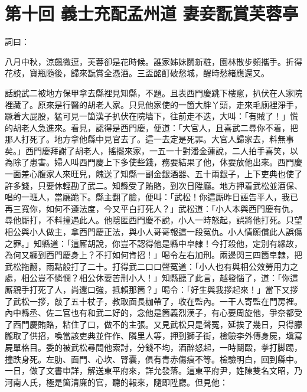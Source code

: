 
\chapter*{第十回 義士充配孟州道 妻妾翫賞芙蓉亭}


詞曰：

\begin{myquote}
八月中秋，涼飆微逗，芙蓉卻是花時候。誰家姊妹鬬新粧，園林散步頻攜手。折得花枝，寶瓶隨後，歸來翫賞全憑酒。三盃酩酊破愁城，醒時愁緒應還又。

\end{myquote}

話說武二被地方保甲拿去縣裡見知縣，不題。且表西門慶跳下樓窻，扒伏在人家院裡藏了。原來是行醫的胡老人家。只見他家使的一箇大胖丫頭，走來毛廁裡淨手，蹶着大屁股，猛可見一箇漢子扒伏在院墻下，往前走不迭，大叫：「有賊了！」{}慌的胡老人急進來。看見，認得是西門慶，便道：「大官人，且喜武二尋你不着，把那人打死了。地方拿他縣中見官去了。這一去定是死罪。大官人歸家去，料無事矣。」西門慶拜謝了胡老人，搖擺來家，一五一十對潘金蓮說，二人拍手喜笑，以為除了患害。{}婦人叫西門慶上下多使些錢，務要結果了他，休要放他出來。西門慶一面差心腹家人來旺兒，餽送了知縣一副金銀酒器、五十兩銀子，上下吏典也使了許多錢，只要休輕勘了武二。知縣受了賄賂，到次日陞廳。地方押着武松並酒保、唱的一班人，當廳跪下。縣主翻了臉，便叫：「武松！你這厮昨日誣告平人，我已再三寬你，如何不遵法度，今又平白打死人？」武松道：「小人本與西門慶有仇，尋他厮打，不料撞遇此人。他隱匿西門慶不說，小人一時怒起，誤將他打死。只望相公與小人做主，拿西門慶正法，與小人哥哥報這一段冤仇。小人情願償此人誤傷之罪。」知縣道：「這厮胡說，你豈不認得他是縣中皁隸！今打殺他，定別有緣故，為何又纏到西門慶身上？不打如何肯招！」喝令左右加刑。兩邊閃三四箇皁隸，把武松拖翻，雨點般打了二十。打得武二口口聲冤道：「小人也有與相公效勞用力之處，相公豈不憐憫？相公休要苦刑小人！」知縣聽了此言，越發惱了，道：「你這厮親手打死了人，尚還口強，抵賴那箇？」喝令：「好生與我拶起來！」當下又拶了武松一拶，敲了五十杖子，教取面長枷帶了，收在監內。一干人寄監在門房裡。內中縣丞、佐二官也有和武二好的，念他是箇義烈漢子，有心要周旋他，爭奈都受了西門慶賄賂，粘住了口，做不的主張。又見武松只是聲冤，延挨了幾日，只得朦朧取了供招，喚當該吏典並仵作、隣里人等，押到獅子街，檢驗李外傳身屍，塡寫屍單格目。委的被武松尋問他索討，分錢不均，酒醉怒起，一時鬬毆，拳打脚踢，撞跌身死。左肋、面門、心坎、腎囊，俱有青赤傷痕不等。檢驗明白，回到縣中。一日，做了文書申詳，解送東平府來，詳允發落。這東平府尹，姓陳雙名文昭，乃河南人氏，極是箇清廉的官，聽的報來，隨即陞廳。但見他：

